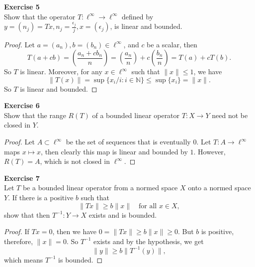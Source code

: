 \documentclass[12pt, a4paper]{article}
\theoremstyle{plain}
\newcommand{\N}{\mathbb{N}}
\newenvironment{exercise}[2][Exercise]
    { \begin{mdframed}[backgroundcolor=gray!20] \textbf{#1 #2} \\}
    {  \end{mdframed}}
\begin{document}
\begin{exercise}{5}
Show that the operator $T: \ell^\infty\rightarrow \ell^\infty$ defined by $y=(n_j)=Tx, n_j = \frac{\epsilon_j}{j}, x=(\epsilon_j)$, is linear and bounded.
\end{exercise}
	\begin{proof}
	Let $a = (a_n),b=(b_n)\in \ell^\infty$, and $c$ be a scalar, then
	\[
	T(a+cb)=\left(\frac{a_n+cb_n}{n}\right)= \left(\frac{a_n}{n}\right) + c\left(\frac{b_n}{n}\right)=T(a)+cT(b).
	\]
	So $T$ is linear. Moreover, for any $x\in \ell^\infty$ such that $\|x\|\leq 1$, we have 
	\[
	\|T(x)\| = \sup\{x_i/i:i\in \N\} \leq \sup\{x_i\} = \|x\|.
	\]
	So $T$ is linear and bounded.
	\end{proof}

\begin{exercise}{6}
Show that the range $R(T)$ of a bounded linear operator $T:X\rightarrow Y$ need not be closed in $Y$.
\end{exercise}
	\begin{proof}
	Let $A\subset \ell^\infty$ be the set of sequences that is eventually $0$. Let $T:A\rightarrow \ell^\infty$ maps $x\mapsto x$, then clearly this map is linear and bounded by $1$. However, $R(T) = A$, which is not closed in $\ell^\infty$.
	\end{proof}

\begin{exercise}{7}
Let $T$ be a bounded linear operator from a normed space $X$ onto a normed space $Y$. If there is a positive $b$ such that 
\[
\|Tx\|\geq b\|x\| \quad \text{for all } x\in X,
\]
show that then $T^{-1}:Y\rightarrow X$ exists and is bounded.
\end{exercise}
	\begin{proof}
	If $Tx=0$, then we have $0=\|Tx\|\geq b\|x\|\geq 0$. But $b$ is positive, therefore, $\|x\|=0$. So $T^{-1}$ exists and by the hypothesis, we get
	\[
	\|y\|\geq b\|T^{-1}(y)\|,
	\]
	which means $T^{-1}$ is bounded.
	\end{proof}
	
\pagebreak
\end{document}
